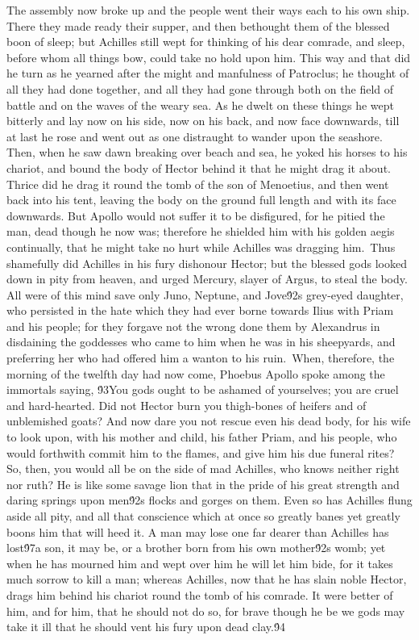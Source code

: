 {  The assembly now broke up and the people went their ways each to his own ship. There they made ready their supper, and then bethought them of the blessed boon of sleep; but Achilles still wept for thinking of his dear comrade, and sleep, before whom all things bow, could take no hold upon him. This way and that did he turn as he yearned after the might and manfulness of Patroclus; he thought of all they had done together, and all they had gone through both on the field of battle and on the waves of the weary sea. As he dwelt on these things he wept bitterly and lay now on his side, now on his back, and now face downwards, till at last he rose and went out as one distraught to wander upon the seashore. Then, when he saw dawn breaking over beach and sea, he yoked his horses to his chariot, and bound the body of Hector behind it that he might drag it about. Thrice did he drag it round the tomb of the son of Menoetius, and then went back into his tent, leaving the body on the ground full length and with its face downwards. But Apollo would not suffer it to be disfigured, for he pitied the man, dead though he now was; therefore he shielded him with his golden aegis continually, that he might take no hurt while Achilles was dragging him.\
Thus shamefully did Achilles in his fury dishonour Hector; but the blessed gods looked down in pity from heaven, and urged Mercury, slayer of Argus, to steal the body. All were of this mind save only Juno, Neptune, and Jove\'92s grey-eyed daughter, who persisted in the hate which they had ever borne towards Ilius with Priam and his people; for they forgave not the wrong done them by Alexandrus in disdaining the goddesses who came to him when he was in his sheepyards, and preferring her who had offered him a wanton to his ruin.\
When, therefore, the morning of the twelfth day had now come, Phoebus Apollo spoke among the immortals saying, \'93You gods ought to be ashamed of yourselves; you are cruel and hard-hearted. Did not Hector burn you thigh-bones of heifers and of unblemished goats? And now dare you not rescue even his dead body, for his wife to look upon, with his mother and child, his father Priam, and his people, who would forthwith commit him to the flames, and give him his due funeral rites? So, then, you would all be on the side of mad Achilles, who knows neither right nor ruth? He is like some savage lion that in the pride of his great strength and daring springs upon men\'92s flocks and gorges on them. Even so has Achilles flung aside all pity, and all that conscience which at once so greatly banes yet greatly boons him that will heed it. A man may lose one far dearer than Achilles has lost\'97a son, it may be, or a brother born from his own mother\'92s womb; yet when he has mourned him and wept over him he will let him bide, for it takes much sorrow to kill a man; whereas Achilles, now that he has slain noble Hector, drags him behind his chariot round the tomb of his comrade. It were better of him, and for him, that he should not do so, for brave though he be we gods may take it ill that he should vent his fury upon dead clay.\'94\
}
